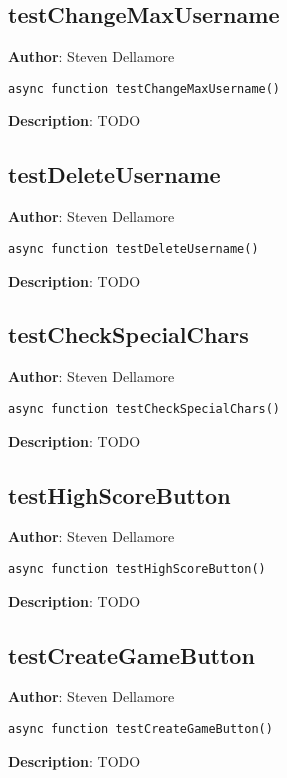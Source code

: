 \documentclass[12pt]{article}
\begin{document}
\subsection{testChangeMaxUsername}
\textbf{Author}: Steven Dellamore 
\vspace*{1\baselineskip}
\begin{lstlisting}
async function testChangeMaxUsername()
\end{lstlisting} 
\vspace*{1\baselineskip}
\textbf{Description}: TODO 



\subsection{testDeleteUsername}
\textbf{Author}: Steven Dellamore 
\vspace*{1\baselineskip}
\begin{lstlisting}
async function testDeleteUsername()
\end{lstlisting} 
\vspace*{1\baselineskip}
\textbf{Description}: TODO 



\subsection{testCheckSpecialChars}
\textbf{Author}: Steven Dellamore 
\vspace*{1\baselineskip}
\begin{lstlisting}
async function testCheckSpecialChars()
\end{lstlisting} 
\vspace*{1\baselineskip}
\textbf{Description}: TODO 



\subsection{testHighScoreButton}
\textbf{Author}: Steven Dellamore 
\vspace*{1\baselineskip}
\begin{lstlisting}
async function testHighScoreButton()
\end{lstlisting} 
\vspace*{1\baselineskip}
\textbf{Description}: TODO 



\subsection{testCreateGameButton}
\textbf{Author}: Steven Dellamore 
\vspace*{1\baselineskip}
\begin{lstlisting}
async function testCreateGameButton()
\end{lstlisting} 
\vspace*{1\baselineskip}
\textbf{Description}: TODO 
\end{document}
